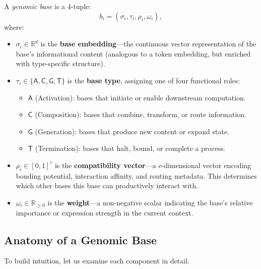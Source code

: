 \begin{definition}
\label{def:genomic-base}
A \emph{genomic base} is a 4-tuple:
\begin{equation}
b_i = (\sigma_i, \tau_i, \rho_i, \omega_i),
\end{equation}
where:
\begin{itemize}[leftmargin=1.5em]
  \item $\sigma_i \in \mathbb{R}^d$ is the \textbf{base embedding}---the continuous vector representation of the base's informational content (analogous to a token embedding, but enriched with type-specific structure).
  \item $\tau_i \in \{\mathsf{A}, \mathsf{C}, \mathsf{G}, \mathsf{T}\}$ is the \textbf{base type}, assigning one of four functional roles:
    \begin{itemize}
      \item $\mathsf{A}$ (Activation): bases that initiate or enable downstream computation.
      \item $\mathsf{C}$ (Composition): bases that combine, transform, or route information.
      \item $\mathsf{G}$ (Generation): bases that produce new content or expand state.
      \item $\mathsf{T}$ (Termination): bases that halt, bound, or complete a process.
    \end{itemize}
  \item $\rho_i \in [0,1]^c$ is the \textbf{compatibility vector}---a $c$-dimensional vector encoding bonding potential, interaction affinity, and routing metadata. This determines which other bases this base can productively interact with.
  \item $\omega_i \in \mathbb{R}_{\ge 0}$ is the \textbf{weight}---a non-negative scalar indicating the base's relative importance or expression strength in the current context.
\end{itemize}
\end{definition}

\subsection{Anatomy of a Genomic Base}

To build intuition, let us examine each component in detail.

